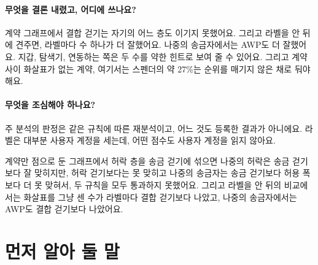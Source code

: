 \documentclass[11pt]{article}
\begin{document}
\paragraph{무엇을 결론 내렸고, 어디에 쓰나요?}
계약 그래프에서 결합 걷기는 자기의 어느 층도 이기지 못했어요. 그리고 라벨을 안 뒤에 견주면, 라벨마다 수 하나가 더 잘했어요. 나중의 송금자에서는 AWP도 더 잘했어요. 지갑, 탐색기, 연동하는 쪽은 두 수를 약한 힌트로 보여 줄 수 있어요. 그리고 계약 사이 화살표가 없는 계약, 여기서는 스펜더의 약 27\%는 순위를 매기지 않은 채로 둬야 해요.

\paragraph{무엇을 조심해야 하나요?}
주 분석의 판정은 같은 규칙에 따른 재분석이고, 어느 것도 등록한 결과가 아니에요. 라벨은 대부분 사용자 계정을 세는데, 어떤 점수도 사용자 계정을 읽지 않아요.

\begin{puri}
계약만 점으로 둔 그래프에서 허락 층을 송금 걷기에 섞으면 나중의 허락은 송금 걷기보다 잘 맞히지만, 허락 걷기보다는 못 맞히고 나중의 송금자는 송금 걷기보다 허용 폭보다 더 못 맞혀서, 두 규칙을 모두 통과하지 못했어요. 그리고 라벨을 안 뒤의 비교에서는 화살표를 그냥 센 수가 라벨마다 결합 걷기보다 나았고, 나중의 송금자에서는 AWP도 결합 걷기보다 나았어요.
\end{puri}

\section*{먼저 알아 둘 말}
\end{document}
